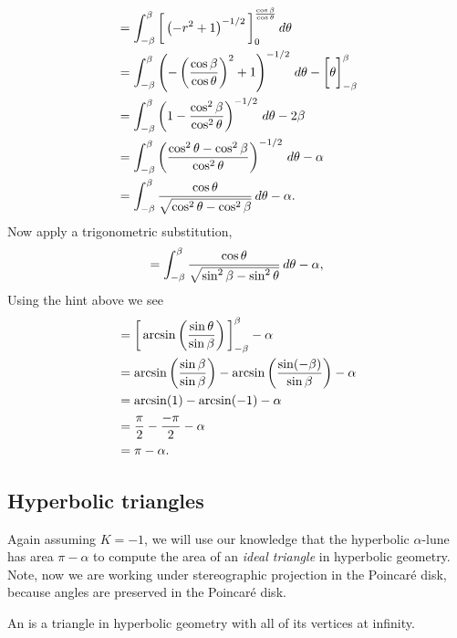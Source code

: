 \documentclass[newpage,hints,12pt,nooutcomes,noauthor,handout]{ximera}
\begin{document}
\begin{problem}
\begin{freeResponse}
\begin{align*}
      &= \int_{-\beta}^\beta \bigg[ \left(-r^2+1\right)^{-1/2} \bigg]_0^{\frac{\cos \beta}{\cos\theta}}\,d \theta\\
      &= \int_{-\beta}^\beta \left(-\left(\frac{\cos \beta}{\cos\theta}\right)^2+1\right)^{-1/2}\,d\theta - \bigg[ \theta \bigg]_{-\beta}^\beta\\
      &= \int_{-\beta}^\beta \left(1-\frac{\cos^2 \beta}{\cos^2\theta}\right)^{-1/2}\,d \theta -2\beta\\
      &= \int_{-\beta}^\beta \left(\frac{\cos^2\theta - \cos^2 \beta}{\cos^2\theta}\right)^{-1/2} \,d \theta-\alpha\\
      &= \int_{-\beta}^\beta \frac{\cos\theta}{\sqrt{\cos^2\theta - \cos^2 \beta}}\,d \theta - \alpha.
    \end{align*}
    Now apply a trigonometric substitution,
    \[
    = \int_{-\beta}^\beta \frac{\cos\theta}{\sqrt{\sin^2\beta - \sin^2 \theta}}\,d \theta- \alpha,
    \]
    Using the hint above we see
    \begin{align*}
      &= \bigg[ \arcsin\left(\frac{\sin\theta}{\sin\beta}\right) \bigg]_{-\beta}^\beta - \alpha\\
      &= \arcsin\left(\frac{\sin\beta}{\sin\beta}\right)- \arcsin\left(\frac{\sin(-\beta)}{\sin\beta}\right)- \alpha\\
      &= \arcsin(1)-\arcsin(-1)-\alpha\\
      &= \frac{\pi}{2}-\frac{-\pi}{2}-\alpha\\
      &= \pi-\alpha.
    \end{align*}
  \end{freeResponse}
\end{problem}


\subsection{Hyperbolic triangles}

Again assuming $K=-1$, we will use our knowledge that the hyperbolic
$\alpha$-lune has area $\pi-\alpha$ to compute the area of an
\textit{ideal triangle} in hyperbolic geometry. Note, now we are
working under stereographic projection in the Poincar\'e disk, because
angles are preserved in the Poincar\'e disk.

\begin{definition}
  An  is a triangle in hyperbolic geometry with all of
  its vertices at infinity.
\end{definition}
\end{document}
